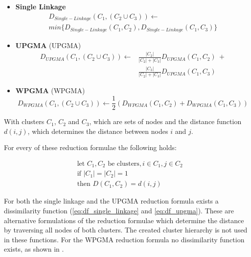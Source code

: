 \begin{itemize}
    \item \textbf{Single Linkage}
    \begin{multline}
    D_{Single-Linkage}(C_1, (C_2 \cup C_3)) \leftarrow \\
    min \{ D_{Single-Linkage}(C_1, C_2), D_{Single-Linkage}(C_1, C_3) \}
    \end{multline}
    \item \textbf{\acrshort{UPGMA}} (\acrlong{UPGMA})
    \begin{equation}
    \begin{split}
    D_{UPGMA}(C_1, (C_2 \cup C_3)) \leftarrow &\frac{|C_2|}{|C_2|+|C_3|}D_{UPGMA}(C_1, C_2)\ + \\ &\frac{|C_3|}{|C_2|+|C_3|}D_{UPGMA}(C_1, C_3)
    \end{split}
    \end{equation}
    \item \textbf{\acrshort{WPGMA}} (\acrlong{WPGMA})
    \begin{equation}
    D_{WPGMA}(C_1, (C_2 \cup C_3)) \leftarrow \frac{1}{2} (D_{WPGMA}(C_1, C_2) + D_{WPGMA}(C_1, C_3))
    \end{equation}
\end{itemize}

With clusters $C_1$, $C_2$ and $C_3$, which are sets of nodes and the distance function $d(i, j)$, which determines the distance between nodes $i$ and $j$.

For every of these reduction formulae the following holds:

\begin{equation}
\begin{split}
&\textrm{let }C_1, C_2\textrm{ be clusters}, i \in C_1, j \in C_2 \\
&\textrm{if }|C_1| = |C_2| = 1 \\
&\textrm{then }D(C_1, C_2) = d(i, j)
\end{split}
\end{equation}

For both the single linkage and the \acrshort{UPGMA} reduction formula exists a dissimilarity function (\ref{eq:df_single_linkage} and \ref{eq:df_upgma}). These are alternative formulations of the reduction formulae which determine the distance by traversing all nodes of both clusters. The created cluster hierarchy is not used in these functions. For the \acrshort{WPGMA} reduction formula no dissimilarity function exists, as shown in \cite{clustering:2007}.

